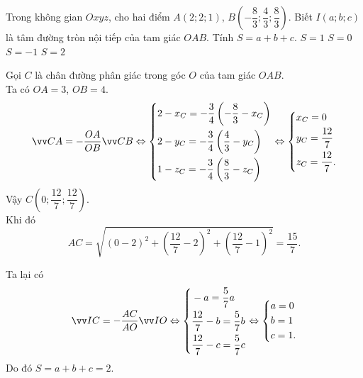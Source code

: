 \begin{ex}%
 Trong không gian $Oxyz$, cho hai điểm $A(2;2;1)$, $B \left( -\dfrac{8}{3}; \dfrac{4}{3}; \dfrac{8}{3} \right)$. Biết $I(a;b;c)$ là tâm đường tròn nội tiếp của tam giác $OAB$. Tính $S = a + b + c$.
 \choice
  {$S = 1$}
  {$S = 0$}
  {$S = -1$}
  {\True $S = 2$}
 \loigiai
  {
  \immini
  {
  Gọi $C$ là chân đường phân giác trong góc $O$ của tam giác $OAB$.\\
  Ta có $OA = 3$, $OB = 4$.
  \begin{align*}
   \vec{CA} = - \dfrac{OA}{OB} \vec{CB}
   \Leftrightarrow  \heva{& 2 - x_C = - \dfrac{3}{4} \left( -\dfrac{8}{3} - x_C \right) \\& 2 - y_C = - \dfrac{3}{4} \left( \dfrac{4}{3} - y_C \right) \\& 1 - z_C = - \dfrac{3}{4} \left( \dfrac{8}{3} - z_C \right)} \Leftrightarrow \heva{& x_C = 0 \\& y_C = \dfrac{12}{7} \\& z_C = \dfrac{12}{7}.}
  \end{align*}
  Vậy $C \left( 0; \dfrac{12}{7}; \dfrac{12}{7} \right)$.\\
  Khi đó $$AC = \sqrt{(0 - 2)^2 + \left( \dfrac{12}{7} - 2 \right)^2 + \left( \dfrac{12}{7} - 1 \right)^2} = \dfrac{15}{7}.$$
  }
  {
  }
  \noindent Ta lại có
  \begin{align*}
   \vec{IC} = -\dfrac{AC}{AO} \vec{IO} \Leftrightarrow \heva{& -a = \dfrac{5}{7}a \\& \dfrac{12}{7} - b = \dfrac{5}{7}b \\& \dfrac{12}{7} - c = \dfrac{5}{7}c} \Leftrightarrow \heva{& a = 0 \\& b = 1 \\& c = 1.}
  \end{align*}
  Do đó $S = a + b + c = 2$.
  }
\end{ex}


